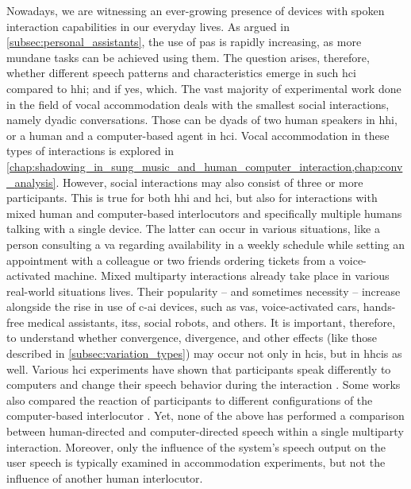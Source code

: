 Nowadays, we are witnessing an ever-growing presence of devices with spoken interaction capabilities in our everyday lives.
As argued in \cref{subsec:personal_assistants}, the use of \acp{pa} is rapidly increasing, as more mundane tasks can be achieved using them.
The question arises, therefore, whether different speech patterns and characteristics emerge in such \ac{hci} compared to \ac{hhi}; and if yes, which.
The vast majority of experimental work done in the field of vocal accommodation deals with the smallest social interactions, namely dyadic conversations.
Those can be dyads of two human speakers in \ac{hhi}, or a human and a computer-based agent in \ac{hci}.
Vocal accommodation in these types of interactions is explored in \cref{chap:shadowing_in_sung_music_and_human_computer_interaction,chap:conv_analysis}.
However, social interactions may also consist of three or more participants.
This is true for both \ac{hhi} and \ac{hci}, but also for interactions with mixed human and computer-based interlocutors and specifically multiple humans talking with a single device.
The latter can occur in various situations, like a person consulting a \ac{va} regarding availability in a weekly schedule while setting an appointment with a colleague or two friends ordering tickets from a voice-activated machine.
Mixed multiparty interactions already take place in various real-world situations lives.
Their popularity -- and sometimes necessity -- increase alongside the rise in use of \ac{c-ai} devices, such as \acp{va}, voice-activated cars, hands-free medical assistants, \acp{its}, social robots, and others.
It is important, therefore, to understand whether convergence, divergence, and other effects (like those described in \cref{subsec:variation_types}) may occur not only in \acp{hci}, but in \acfp{hhci} as well.
Various \ac{hci} experiments have shown that participants speak differently to computers and change their speech behavior during the interaction \citep[e.g.,][]{Branigan2010linguistic}.
Some works also compared the reaction of participants to different configurations of the computer-based interlocutor \citep[e.g.,][]{Levitan2016implementing}.
Yet, none of the above has performed a comparison between human-directed and computer-directed speech within a single multiparty interaction.
Moreover, only the influence of the system's speech output on the user speech is typically examined in accommodation experiments, but not the influence of another human interlocutor.

